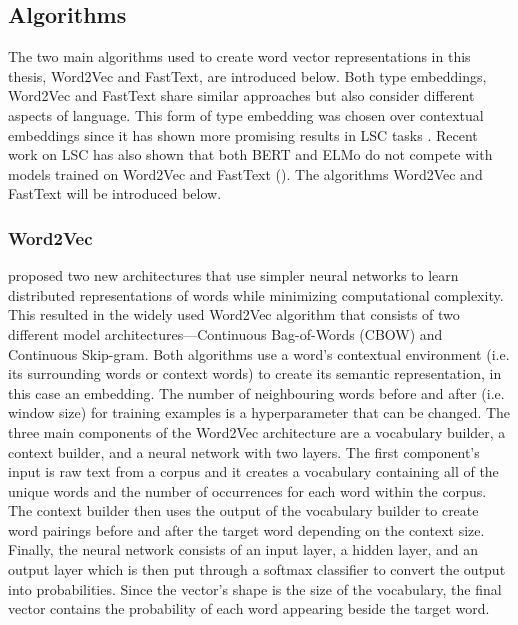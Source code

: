 \subsection{Algorithms}

The two main algorithms used to create word vector representations in this thesis, Word2Vec and FastText, are introduced below. Both type embeddings, Word2Vec and FastText share similar approaches but also consider different aspects of language. This form of type embedding was chosen over contextual embeddings since it has shown more promising results in LSC tasks \citep{schlechtweg-etal-2020-semeval}. Recent work on LSC has also shown that both BERT and ELMo do not compete with models trained on Word2Vec and FastText (\citet{schlechtweg-etal-2020-semeval, kaiser-diacrita2020,laicher-2020, uiouva-kutuzovsemeval2020}). The algorithms Word2Vec and FastText will be introduced below. 


\subsubsection{Word2Vec}
\citet{mikolov2013efficient} proposed two new architectures that use simpler neural networks to learn distributed representations of words while minimizing computational complexity. This resulted in the widely used Word2Vec algorithm that consists of two different model architectures—Continuous Bag-of-Words (CBOW) and Continuous Skip-gram. Both algorithms use a word’s contextual environment (i.e. its surrounding words or context words) to create its semantic representation, in this case an embedding. The number of neighbouring words before and after (i.e. window size) for training examples is a hyperparameter that can be changed. The three main components of the Word2Vec architecture are a vocabulary builder, a context builder, and a neural network with two layers. The first component’s input is raw text from a corpus and it creates a vocabulary containing all of the unique words and the number of occurrences for each word within the corpus. The context builder then uses the output of the vocabulary builder to create word pairings before and after the target word depending on the context size. Finally, the neural network consists of an input layer, a hidden layer, and an output layer which is then put through a softmax classifier to convert the output into probabilities. Since the vector’s shape is the size of the vocabulary, the final vector contains the probability of each word appearing beside the target word. 

